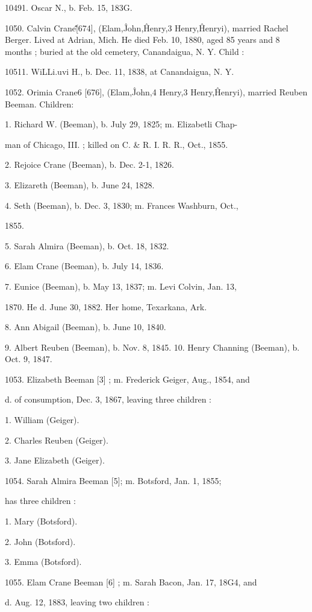 \documentclass{book}
\begin{document}
10491. Oscar N., b. Feb. 15, 183G. 

1050. Calvin Crane\^\^ [674], (Elam,\^ John,\^ Henry,3 Henry,\^ 
Henryi), married Rachel Berger. Lived at Adrian, Mich. He 
died Feb. 10, 1880, aged 85 years and 8 months ; buried at the 
old cemetery, Canandaigua, N. Y. Child : 

10511. WiLLi.uvi H., b. Dec. 11, 1838, at Canandaigua, N. Y. 

1052. Orimia Crane6 [676], (Elam,\^ John,4 Henry,3 Henry,\^ 
Henryi), married Reuben Beeman. Children: 

1. Richard W. (Beeman), b. July 29, 1825; m. Elizabetli Chap- 

man of Chicago, III. ; killed on C. \& R. I. R. R., Oct., 1855. 

2. Rejoice Crane (Beeman), b. Dec. 2-1, 1826. 

3. Elizareth (Beeman), b. June 24, 1828. 

4. Seth (Beeman), b. Dec. 3, 1830; m. Frances Washburn, Oct., 

1855. 

5. Sarah Almira (Beeman), b. Oct. 18, 1832. 

6. Elam Crane (Beeman), b. July 14, 1836. 

7. Eunice (Beeman), b. May 13, 1837; m. Levi Colvin, Jan. 13, 

1870. He d. June 30, 1882. Her home, Texarkana, Ark. 

8. Ann Abigail (Beeman), b. June 10, 1840. 

9. Albert Reuben (Beeman), b. Nov. 8, 1845. 
10. Henry Channing (Beeman), b. Oct. 9, 1847. 

1053. Elizabeth Beeman [3] ; m. Frederick Geiger, Aug., 1854, and 

d. of consumption, Dec. 3, 1867, leaving three children : 

1. William (Geiger). 

2. Charles Reuben (Geiger). 

3. Jane Elizabeth (Geiger). 

1054. Sarah Almira Beeman [5]; m. Botsford, Jan. 1, 1855; 

has three children : 

1. Mary (Botsford). 

2. John (Botsford). 

3. Emma (Botsford). 

1055. Elam Crane Beeman [6] ; m. Sarah Bacon, Jan. 17, 18G4, and 

d. Aug. 12, 1883, leaving two children : 
\end{document}
